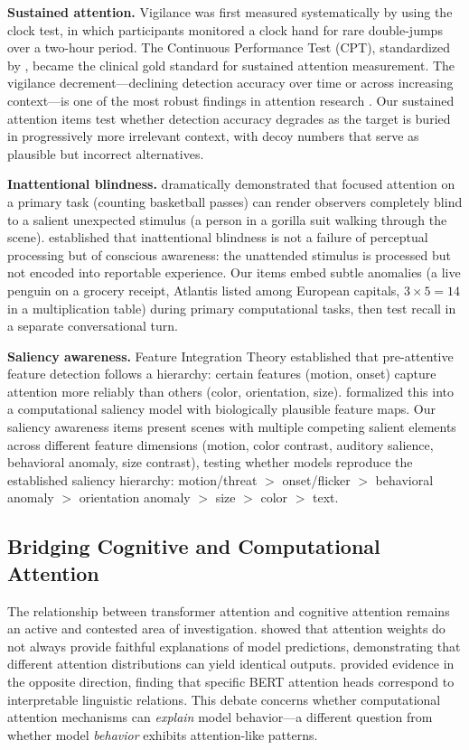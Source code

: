 \documentclass{article}
\begin{document}
\textbf{Sustained attention.} Vigilance was first measured systematically by \citet{mackworth1948} using the clock test, in which participants monitored a clock hand for rare double-jumps over a two-hour period. The Continuous Performance Test (CPT), standardized by \citet{rosvold1956}, became the clinical gold standard for sustained attention measurement. The vigilance decrement---declining detection accuracy over time or across increasing context---is one of the most robust findings in attention research \citep{warm2008}. Our sustained attention items test whether detection accuracy degrades as the target is buried in progressively more irrelevant context, with decoy numbers that serve as plausible but incorrect alternatives.

\textbf{Inattentional blindness.} \citet{simons1999} dramatically demonstrated that focused attention on a primary task (counting basketball passes) can render observers completely blind to a salient unexpected stimulus (a person in a gorilla suit walking through the scene). \citet{mack1998} established that inattentional blindness is not a failure of perceptual processing but of conscious awareness: the unattended stimulus is processed but not encoded into reportable experience. Our items embed subtle anomalies (a live penguin on a grocery receipt, Atlantis listed among European capitals, $3 \times 5 = 14$ in a multiplication table) during primary computational tasks, then test recall in a separate conversational turn.

\textbf{Saliency awareness.} Feature Integration Theory \citep{treisman1980} established that pre-attentive feature detection follows a hierarchy: certain features (motion, onset) capture attention more reliably than others (color, orientation, size). \citet{itti2001} formalized this into a computational saliency model with biologically plausible feature maps. Our saliency awareness items present scenes with multiple competing salient elements across different feature dimensions (motion, color contrast, auditory salience, behavioral anomaly, size contrast), testing whether models reproduce the established saliency hierarchy: motion/threat $>$ onset/flicker $>$ behavioral anomaly $>$ orientation anomaly $>$ size $>$ color $>$ text.

\subsection{Bridging Cognitive and Computational Attention}

The relationship between transformer attention and cognitive attention remains an active and contested area of investigation. \citet{jain2019} showed that attention weights do not always provide faithful explanations of model predictions, demonstrating that different attention distributions can yield identical outputs. \citet{clark2019} provided evidence in the opposite direction, finding that specific BERT attention heads correspond to interpretable linguistic relations. This debate concerns whether computational attention mechanisms can \emph{explain} model behavior---a different question from whether model \emph{behavior} exhibits attention-like patterns.
\end{document}
